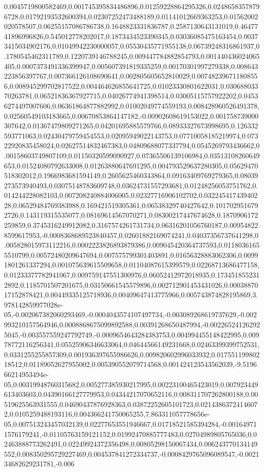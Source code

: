 0.0045719800582469,0.001745395834486896,0.01259228864295326,0.02486583578796728,0.01792193532600394,0.02307252473488189,0.01141012669363253,0.01562002020578507,0.06255157086786738,0.1648823331836787,0.2587130643131019,0.4647741896996826,0.545012778202017,0.1873434523390345,0.03036085475163454,0.00373415034902176,0.01049942230000057,0.05530435771955138,0.06739248316861937,0.1780545462311789,0.1220739146788245,0.009447784882854793,0.001440436024065405,0.0007373491336399947,0.005607391819335259,0.00170301997279338,0.008643223856397767,0.007366126108690641,0.002805605652810029,0.007482396711808556,0.008945299702817522,0.004464626855641725,0.01023330801622031,0.03068803370263781,0.06521836367927715,0.04026774941398514,0.03005115757922202,0.04536274497007606,0.06361864877882992,0.01002049774559193,0.008428960526491378,0.02560549103183665,0.00670853864147182,-0.00902608619153022,0.001758739000307642,0.01367479809271265,0.04201695885579766,0.08933327673998695,0.126332593771063,0.02430479759454553,0.02095949022143753,0.07710058185219974,0.07322920835458024,0.02627514832467383,0.04809688077337794,0.0545269793436662,0.00158603749807109,0.01150320599090927,0.07365506139106984,0.03513108260649653,0.01524080792633008,0.01263880647691295,0.004793529637280305,0.05629470518302012,0.1966983681594149,0.2605625460343864,0.09163409769279365,0.08039273573940493,0.03075148783609748,0.03624731557293681,0.01248256053751762,0.014244228082103,0.007208240884006005,0.02327716906102702,0.03224541743940228,0.06529484769383988,0.169421519305361,0.06538329740427642,0.1017029516792726,0.143119315535077,0.08169614567070271,0.08300217447674628,0.1870906172259859,0.3745316249912082,0.3167574261731734,0.06316201056760187,0.009548228599617953,-0.0008368689523840457,0.02601882169074241,0.04037356737641298,0.005828015973112216,0.0002223826893879386,0.009045420364737593,0.01180361655510799,0.00572480209647694,0.007575799301403891,0.01656328883062306,0.00991801261337294,0.001075639615509658,0.01104087615399579,0.02268713686477158,0.01233377782941067,0.009759147551300976,0.06052412972018935,0.1734518552312892,0.1185701507201675,0.03150661545579896,0.002712901453431026,0.0003887017152878421,0.00449335125718936,0.00409647413775966,0.005743874828195869,3.978142859977028e-05,-0.002067382060293469,-0.0004043574107497734,-0.003089268619737629,-0.002993210157564946,0.0008868675099892588,0.00391268650487994,-0.002265241262925045,-0.003557559247792749,-0.0009654643284383753,0.004994455148422995,0.00978772116256341,0.05525906346633064,0.04644566149231668,0.02463399399752531,0.0331255255857309,0.001936397655986626,0.009820602996033932,0.01755119980218512,0.01189052627955002,0.005390552079714568,0.001424123543562039,-9.519666214953494e-05,0.00319948760315682,0.005277385930217995,0.00223100465423019,0.007923449613403603,0.04390166127779953,0.04344217070652116,0.008311707262800188,0.00519625563931555,0.04690437876928363,0.03872252605101723,0.02143863724146072,0.0105259488193116,0.004366241750065255,7.863311057778656e-05,0.007513243457032139,0.02277653551946667,0.01718521585394284,-0.001649711576179241,-0.01105763159121152,0.01992470885777483,0.02704989805765036,0.02463888773262491,0.02249924372356498,0.00805298150067434,0.006243770134149552,0.008350295729227469,0.004537841272334737,-0.0008429765096089547,-0.002134682629231781,-0.006